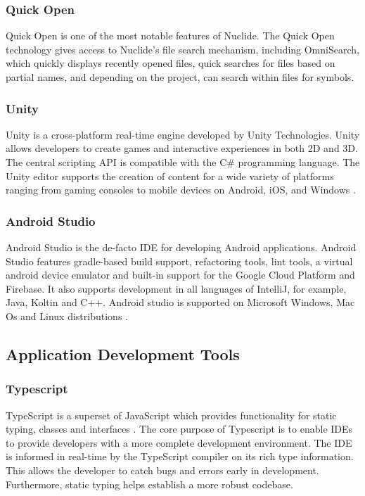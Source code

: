 \subsubsection{Quick Open}
Quick Open is one of the most notable features of Nuclide. The Quick Open technology gives access to Nuclide’s file search mechanism, including OmniSearch, which quickly displays recently opened files, quick searches for files based on partial names, and depending on the project, can search within files for symbols\cite{quickopen}.


\subsubsection{Unity}
Unity is a cross-platform real-time engine developed by Unity Technologies. Unity allows developers to create games and interactive experiences in both 2D and 3D. The central scripting API is compatible with the C\# programming language. The Unity editor supports the creation of content for a wide variety of platforms ranging from gaming consoles to mobile devices on Android, iOS, and Windows \cite{unity}. 

\subsubsection{Android Studio}
Android Studio is the de-facto IDE for developing Android applications. Android Studio features gradle-based build support, refactoring tools, lint tools, a virtual android device emulator and built-in support for the Google Cloud Platform and Firebase. It also supports development in all languages of IntelliJ, for example, Java, Koltin and C++. Android studio is supported on Microsoft Windows, Mac Os and Linux distributions \cite{android_studio}. 


\subsection{Application Development Tools}

\subsubsection{Typescript}
TypeScript is a superset of JavaScript which provides functionality for static typing, classes and interfaces \cite{typescript}. The core purpose of Typescript is to enable IDEs to provide developers with a more complete development environment.  The IDE is informed in real-time by the TypeScript compiler on its rich type information. This allows the developer to catch bugs and errors early in development. Furthermore,  static typing helps establish a more robust codebase.

